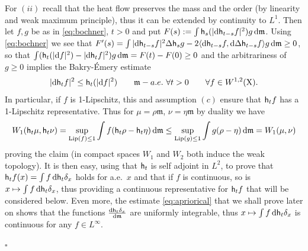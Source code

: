 \documentclass[11pt]{article}
\numberwithin{equation}{section}
\newenvironment{idea}{\removelastskip\par\medskip   %
\noindent{\em Idea of the proof} \rm}{\penalty-20\null\hfill$\square$\par\medbreak}
\newcommand{\X}{{\rm X}}
\newcommand{\mm}{{\mathfrak m}}
\renewcommand{\d}{{\rm d}}
\newcommand{\Lip}{{\rm Lip}}
\newcommand{\h}{{\sf h}} %
\newcommand\la{\langle}
\newcommand\ra{\rangle}
\begin{document}
\begin{idea}
For $(ii)$  recall that the heat flow preserves the mass and the order (by linearity and weak maximum principle), thus it can be extended by continuity to $L^1$. Then let $f, g$ be as in \eqref{eq:bochner}, $t>0$ and put $F(s):=\int\h_s(|\d\h_{t-s}f|^2)g\,\d\mm$. Using \eqref{eq:bochner} we see that $F'(s)=\int |\d\h_{t-s}f|^2\Delta\h_sg-2\la\d\h_{t-s}f,\d\Delta\h_{t-s}f \ra g\,\d\mm\geq0$, so that $\int(\h_t(|\d f|^2)-|\d \h_tf|^2)g\,\d\mm=F(t)-F(0)\geq 0 $ and  the arbitrariness of $g\geq 0$ implies  the Bakry-\'Emery estimate
\begin{equation}
\label{eq:BElav}
|\d \h_tf|^2\leq\h_t(|\d f|^2)\qquad\mm-a.e.\ \forall t>0\qquad\forall f\in W^{1,2}(\X).
\end{equation}
In particular, if $f$ is 1-Lipschitz, this and  assumption $(c)$ ensure that $\h_tf$ has a 1-Lipschitz representative.  Thus for $\mu=\rho\mm$, $\nu=\eta\mm$ by duality we have
\[
W_1(\h_t\mu,\h_t\nu)=\sup_{\Lip(f)\leq 1}\int f(\h_t\rho-\h_t\eta)\,\d\mm\leq \sup_{\Lip(g)\leq 1}\int g(\rho-\eta)\,\d\mm=W_1(\mu,\nu)
\]
proving the claim (in compact spaces $W_1$ and $W_2$ both induce the weak topology). It is then easy, using that $\h_t$ is self adjoint in $L^2$, to prove that $\h_tf(x)=\int f\,\d\h_t\delta_x$ holds for a.e.\ $x$ and that if $f$ is continuous, so is $x\mapsto \int f\,\d\h_t\delta_x$, thus providing a continuous representative for $\h_tf$ that will be considered below. Even more, the estimate \eqref{eq:apriorical} that we shall prove later on shows that the functions $\frac{\d\h_t\delta_x}{\d\mm}$ are uniformly integrable, thus $x\mapsto \int f\,\d\h_t\delta_x $ is continuous for any $f\in L^\infty$.
 

\end{idea}
\end{document}
